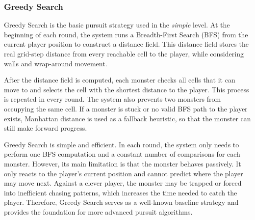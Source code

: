 \subsubsection{Greedy Search}
Greedy Search is the basic pursuit strategy used in the \textit{simple} level. 
At the beginning of each round, the system runs a Breadth-First Search (BFS) 
from the current player position to construct a distance field. This distance 
field stores the real grid-step distance from every reachable cell to the player, 
while considering walls and wrap-around movement.

After the distance field is computed, each monster checks all cells that it can 
move to and selects the cell with the shortest distance to the player. This 
process is repeated in every round. The system also prevents two monsters from 
occupying the same cell. If a monster is stuck or no valid BFS path to the player 
exists, Manhattan distance is used as a fallback heuristic, so that the monster 
can still make forward progress.

Greedy Search is simple and efficient. In each round, the system only needs to 
perform one BFS computation and a constant number of comparisons for each monster. 
However, its main limitation is that the monster behaves passively. It only reacts 
to the player's current position and cannot predict where the player may move next. 
Against a clever player, the monster may be trapped or forced into inefficient 
chasing patterns, which increases the time needed to catch the player. Therefore, 
Greedy Search serves as a well-known baseline strategy and provides the foundation 
for more advanced pursuit algorithms.
